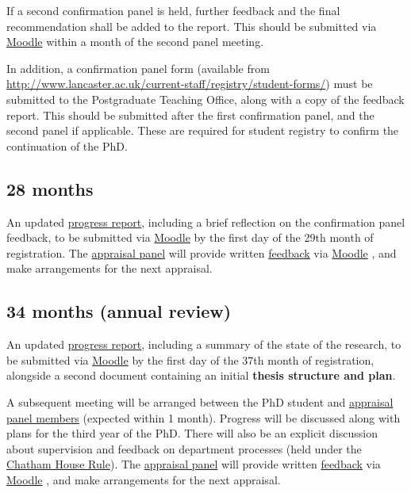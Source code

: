 \documentclass[12pt,a4paper]{article}
\begin{document}
If a second confirmation panel is held, further feedback and the final recommendation shall be added to the report. This should be submitted via \href{https://modules.lancaster.ac.uk/course/view.php?id=7050}{Moodle} within a month of the second panel meeting.

In addition, a confirmation panel form (available from \url{http://www.lancaster.ac.uk/current-staff/registry/student-forms/}) must be submitted to the Postgraduate Teaching Office, along with a copy of the feedback report. This should be submitted after the first confirmation panel, and the second panel if applicable. These are required for student registry to confirm the continuation of the PhD.


\subsection{28 months} \label{sec:28months}
An updated \hyperref[sec:report]{progress report}, including a brief reflection on the confirmation panel feedback, to be submitted via \href{https://modules.lancaster.ac.uk/course/view.php?id=7050}{Moodle}  by the first day of the 29th month of registration. The \hyperref[sec:panel]{appraisal panel} will provide written \hyperref[sec:feedback]{feedback} via \href{https://modules.lancaster.ac.uk/course/view.php?id=7050}{Moodle} , and make arrangements for the next appraisal.


\subsection{34 months (annual review)} \label{sec:34months}
An updated \hyperref[sec:report]{progress report}, including a summary of the state of the research, to be submitted via \href{https://modules.lancaster.ac.uk/course/view.php?id=7050}{Moodle}  by the first day of the 37th month of registration, alongside a second document containing an initial \textbf{thesis structure and plan}.

A subsequent meeting will be arranged between the PhD student and \hyperref[sec:panel]{appraisal panel members} (expected within 1 month). Progress will be discussed along with plans for the third year of the PhD. There will also be an explicit discussion about supervision and feedback on department processes (held under the \href{https://www.chathamhouse.org/chatham-house-rule}{Chatham House Rule}). The \hyperref[sec:panel]{appraisal panel} will provide written \hyperref[sec:feedback]{feedback} via \href{https://modules.lancaster.ac.uk/course/view.php?id=7050}{Moodle} , and make arrangements for the next appraisal.
\end{document}
